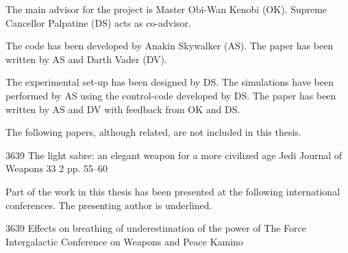 %
\begin{divisionofwork}
{%
	The main advisor for the project is Master Obi-Wan Kenobi (OK).
	Supreme Cancellor Palpatine (DS) acts as co-advisor.
}%

	\paperitem
		The code has been developed by Anakin Skywalker (AS).
		The paper has been written by AS and Darth Vader (DV).

	\paperitem
		The experimental set-up has been designed by DS.
		The simulations have been performed by AS using the control-code
		developed by DS.
		The paper has been written by AS and DV with feedback from OK and DS.

\end{divisionofwork}


%
\begin{otherpublications}
{%
	The following papers, although related, are not included in this thesis.
}%

          {3639}%
          {The light sabre: an elegant weapon for a more civilized age}%
          {Jedi Journal of Weapons}%
          {33}%
          {2}%
          {pp. 55--60}%

\end{otherpublications}


%
\begin{conferences}
{%
	Part of the work in this thesis has been presented at the following
        international conferences. The presenting author is underlined.
}%

               {3639}%
               {Effects on breathing of underestimation of the power of The Force}%
               {Intergalactic Conference on Weapons and Peace}%
               {Kamino}%

\end{conferences}


%
\tableofcontents
